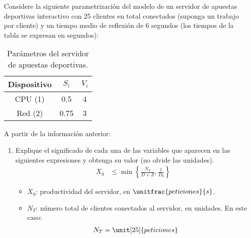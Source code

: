 \begin{ejercicio}\label{ej:5.27}
    Considere la siguiente parametrización del modelo de un servidor de apuestas deportivas interactivo con 25 clientes en total conectados (suponga un trabajo por cliente) y un tiempo medio de reflexión de 6 segundos (los tiempos de la tabla se expresan en segundos):
    \begin{table}[h]
        \centering
        \begin{tabular}{|c|c|c|}
            \hline
            Dispositivo & $S_i$ & $V_i$ \\
            \hline
            CPU (1) & 0.5 & 4 \\
            Red (2) & 0.75 & 3 \\
            \hline
        \end{tabular}
        \caption{Parámetros del servidor de apuestas deportivas.}
        \label{tab:5.27}
    \end{table}
    A partir de la información anterior:
    \begin{enumerate}
        \item Explique el significado de cada una de las variables que aparecen en las siguientes expresiones y obtenga su valor (no olvide las unidades).
        \begin{align*}
            X_0 &\leq \min\left\{\frac{N_T}{D+Z}, \frac{1}{D_b}\right\}
        \end{align*}
        \begin{itemize}
            \item $X_0$: productividad del servidor, en $\unitfrac{peticiones}{s}$.
            \item $N_T$: número total de clientes conectados al servidor, en unidades. En este caso:
            \begin{align*}
                N_T &= \unit[25]{peticiones}
            \end{align*}


\end{itemize}
\end{enumerate}
\end{ejercicio}
